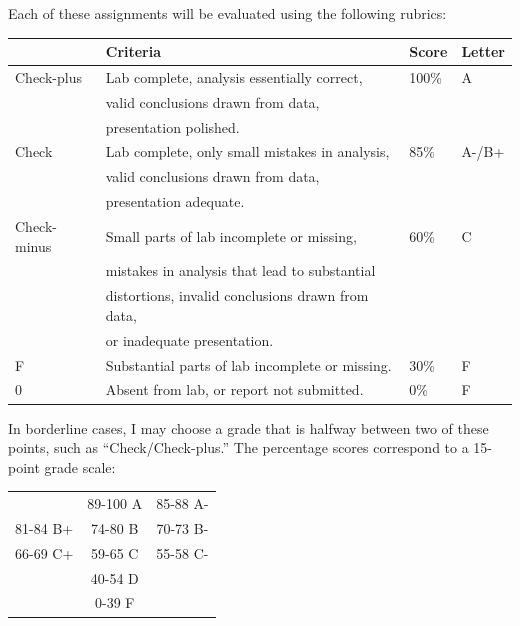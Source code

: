 \documentclass[11pt]{article}
\begin{document}
Each of these assignments will be evaluated using the following rubrics:
\begin{center}
\begin{tabular}{|l|l|l|l|}
\hline
           & Criteria                                           & Score & Letter \\
\hline
\hline
Check-plus  & Lab complete, analysis essentially correct,  & 100\% & A \\
           & valid conclusions drawn from data,                 &    & \\
           & presentation polished.                             &    & \\
\hline
Check       & Lab complete, only small mistakes in analysis,     & 85\%  & A-/B+ \\
           & valid conclusions drawn from data,         &    & \\
           & presentation adequate.                             &    & \\
\hline
Check-minus & Small parts of lab incomplete or missing,          & 60\%  & C \\
           & mistakes in analysis that lead to substantial & & \\
           & distortions, invalid conclusions drawn from data,  &    & \\
           & or inadequate presentation.               &    & \\
\hline
F           & Substantial parts of lab incomplete or missing.    & 30\%  & F \\
\hline
0           & Absent from lab, or report not submitted.        & 0\%  & F \\
\hline
\end{tabular}
\end{center}
\noindent In borderline cases, I may choose a grade that is halfway between two of
these points, such as ``Check/Check-plus.''  The percentage scores correspond
to a 15-point grade scale:
\begin{center}
\begin{tabular}{ccc}
         & 89-100 A & 85-88 A- \\
81-84 B+ & 74-80 B & 70-73 B- \\
66-69 C+ & 59-65 C & 55-58 C- \\
         & 40-54 D &  \\
         & 0-39 F & \\
\end{tabular}
\end{center}
\end{document}
